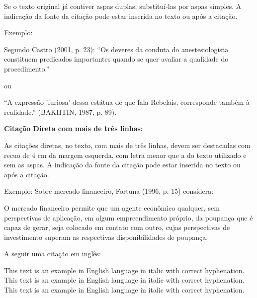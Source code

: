 Se o texto original já contiver aspas duplas, substituí-las por aspas simples. A indicação da fonte da citação pode
estar inserida no texto ou após a citação.

\bigskip

{\color{red}
Exemplo:}

\bigskip

Segundo Castro (2001, p. 23): ``Os deveres da conduta do anestesiologista constituem predicados importantes
quando se quer avaliar a qualidade do procedimento.''\\


\bigskip

{\color{red}
ou}

\bigskip

{
``A expressão 'furiosa' dessa estátua de que fala Rebelais, corresponde também à realidade.''
(BAKHTIN, 1987, p. 89).}

\bigskip

{\centering\bfseries\color{red}
Citação Direta com mais de três linhas:
\par}

\bigskip

As citações diretas, no texto, com mais de três linhas, devem ser
destacadas com recuo de 4 cm da margem esquerda, com letra menor que a do texto utilizado e sem as aspas. A indicação da fonte da citação pode estar inserida no texto ou após a citação. \\

\bigskip

{\color{red}
Exemplo:}
\bigskip
Sobre mercado financeiro, Fortuna (1996, p. 15) considera:\\
\bigskip

\begin{citacao}
O mercado financeiro permite que um agente econômico qualquer, sem perspectivas de aplicação, em algum empreendimento
próprio, da poupança que é capaz de gerar, seja colocado em contato com outro, cujas perspectivas de investimento
superam as respectivas disponibilidades de poupança.\\
\end{citacao}

\bigskip
A seguir uma citação em inglês:\\

\begin{citacao}[english]
This text is an example in English language in italic with correct hyphenation. This text is an example in English language in italic with correct hyphenation. This text is an example in English language in italic with correct hyphenation.
\end{citacao}
\bigskip

